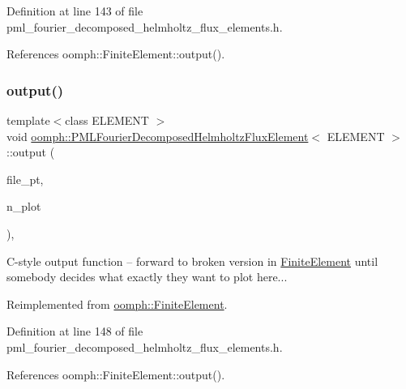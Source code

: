 Definition at line 143 of file pml\+\_\+fourier\+\_\+decomposed\+\_\+helmholtz\+\_\+flux\+\_\+elements.\+h.



References oomph\+::\+Finite\+Element\+::output().

\mbox{\label{classoomph_1_1PMLFourierDecomposedHelmholtzFluxElement_a0e6e5da60194eadcc9eaa50cabe0eafb}} 
\subsubsection{\texorpdfstring{output()}{output()}\hspace{0.1cm}{\footnotesize\ttfamily [4/4]}}
{\footnotesize\ttfamily template$<$class E\+L\+E\+M\+E\+NT $>$ \\
void \hyperlink{classoomph_1_1PMLFourierDecomposedHelmholtzFluxElement}{oomph\+::\+P\+M\+L\+Fourier\+Decomposed\+Helmholtz\+Flux\+Element}$<$ E\+L\+E\+M\+E\+NT $>$\+::output (\begin{DoxyParamCaption}\item[{F\+I\+LE $\ast$}]{file\+\_\+pt,  }\item[{const unsigned \&}]{n\+\_\+plot }\end{DoxyParamCaption})\hspace{0.3cm}{\ttfamily [inline]}, {\ttfamily [virtual]}}



C-\/style output function -- forward to broken version in \hyperlink{classoomph_1_1FiniteElement}{Finite\+Element} until somebody decides what exactly they want to plot here... 



Reimplemented from \hyperlink{classoomph_1_1FiniteElement_adfaee690bb0608f03320eeb9d110d48c}{oomph\+::\+Finite\+Element}.



Definition at line 148 of file pml\+\_\+fourier\+\_\+decomposed\+\_\+helmholtz\+\_\+flux\+\_\+elements.\+h.



References oomph\+::\+Finite\+Element\+::output().

